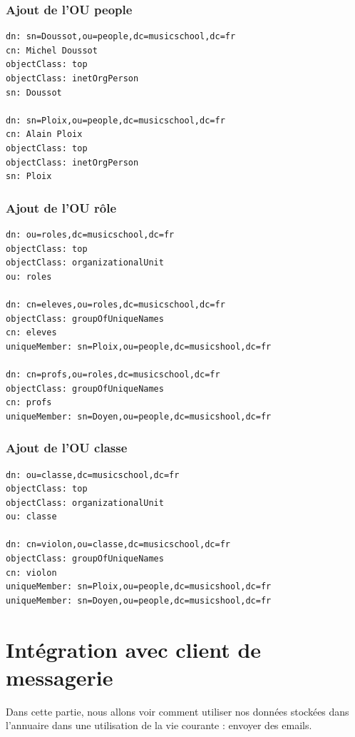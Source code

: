 \documentclass[12pt,a4paper,notitlepage]{article}
\begin{document}
\subsubsection{Ajout de l'OU people}

\begin{lstlisting}[title=people.ldif]
dn: sn=Doussot,ou=people,dc=musicschool,dc=fr
cn: Michel Doussot
objectClass: top
objectClass: inetOrgPerson
sn: Doussot

dn: sn=Ploix,ou=people,dc=musicschool,dc=fr
cn: Alain Ploix
objectClass: top
objectClass: inetOrgPerson
sn: Ploix
\end{lstlisting}

\subsubsection{Ajout de l'OU rôle}

\begin{lstlisting}[title=role.ldif]
dn: ou=roles,dc=musicschool,dc=fr
objectClass: top
objectClass: organizationalUnit
ou: roles

dn: cn=eleves,ou=roles,dc=musicschool,dc=fr
objectClass: groupOfUniqueNames
cn: eleves
uniqueMember: sn=Ploix,ou=people,dc=musicshool,dc=fr

dn: cn=profs,ou=roles,dc=musicschool,dc=fr
objectClass: groupOfUniqueNames
cn: profs
uniqueMember: sn=Doyen,ou=people,dc=musicshool,dc=fr
\end{lstlisting}

\subsubsection{Ajout de l'OU classe}

\begin{lstlisting}[title=classe.ldif]
dn: ou=classe,dc=musicschool,dc=fr
objectClass: top
objectClass: organizationalUnit
ou: classe

dn: cn=violon,ou=classe,dc=musicschool,dc=fr
objectClass: groupOfUniqueNames
cn: violon
uniqueMember: sn=Ploix,ou=people,dc=musicshool,dc=fr
uniqueMember: sn=Doyen,ou=people,dc=musicshool,dc=fr
\end{lstlisting}

\clearpage
\section{Intégration avec client de messagerie}

Dans cette partie, nous allons voir comment utiliser nos données stockées dans l'annuaire dans une utilisation de la vie courante : envoyer des emails.
\end{document}
